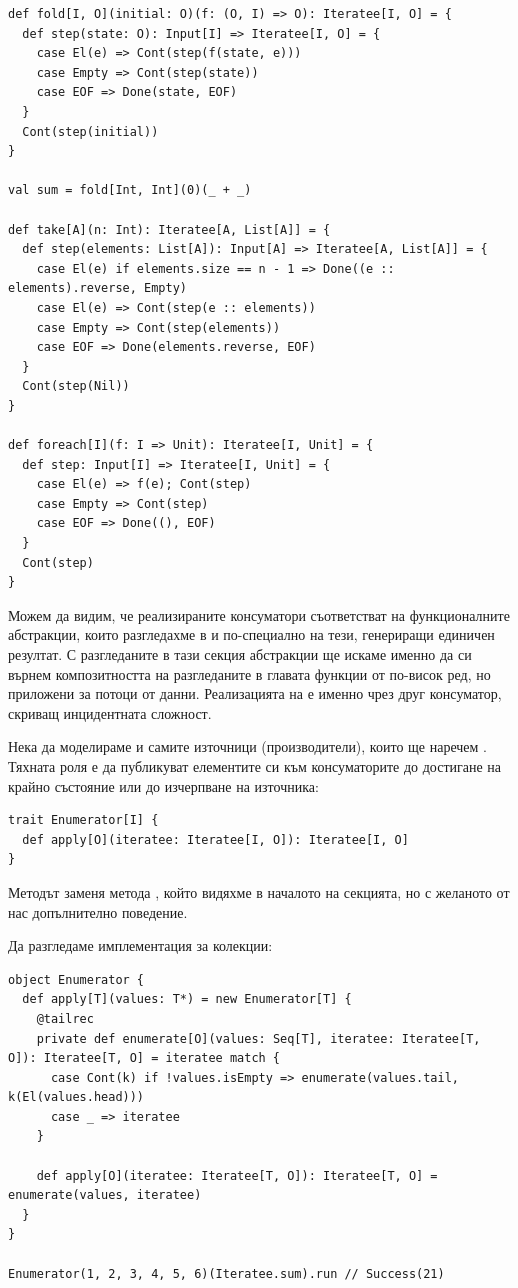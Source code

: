\begin{lstlisting}
def fold[I, O](initial: O)(f: (O, I) => O): Iteratee[I, O] = {
  def step(state: O): Input[I] => Iteratee[I, O] = {
    case El(e) => Cont(step(f(state, e)))
    case Empty => Cont(step(state))
    case EOF => Done(state, EOF)
  }
  Cont(step(initial))
}

val sum = fold[Int, Int](0)(_ + _)

def take[A](n: Int): Iteratee[A, List[A]] = {
  def step(elements: List[A]): Input[A] => Iteratee[A, List[A]] = {
    case El(e) if elements.size == n - 1 => Done((e :: elements).reverse, Empty)
    case El(e) => Cont(step(e :: elements))
    case Empty => Cont(step(elements))
    case EOF => Done(elements.reverse, EOF)
  }
  Cont(step(Nil))
}

def foreach[I](f: I => Unit): Iteratee[I, Unit] = {
  def step: Input[I] => Iteratee[I, Unit] = {
    case El(e) => f(e); Cont(step)
    case Empty => Cont(step)
    case EOF => Done((), EOF)
  }
  Cont(step)
}
\end{lstlisting}

Можем да видим, че реализираните консуматори съответстват на функционалните абстракции, които разгледахме в  и по-специално на тези, генериращи единичен резултат. С разгледаните в тази секция абстракции ще искаме именно да си върнем композитността на разгледаните в главата функции от по-висок ред, но приложени за потоци от данни. Реализацията на  е именно чрез друг консуматор, скриващ инцидентната сложност.

Нека да моделираме и самите източници (производители), които ще наречем . Тяхната роля е да публикуват елементите си към консуматорите до достигане на крайно състояние или до изчерпване на източника:

\begin{lstlisting}
trait Enumerator[I] {
  def apply[O](iteratee: Iteratee[I, O]): Iteratee[I, O]
}
\end{lstlisting}

Методът  заменя метода , който видяхме в началото на секцията, но с желаното от нас допълнително поведение.

Да разгледаме имплементация за колекции:

\begin{lstlisting}
object Enumerator {
  def apply[T](values: T*) = new Enumerator[T] {
    @tailrec
    private def enumerate[O](values: Seq[T], iteratee: Iteratee[T, O]): Iteratee[T, O] = iteratee match {
      case Cont(k) if !values.isEmpty => enumerate(values.tail, k(El(values.head)))
      case _ => iteratee
    }
  
    def apply[O](iteratee: Iteratee[T, O]): Iteratee[T, O] = enumerate(values, iteratee)
  }
}

Enumerator(1, 2, 3, 4, 5, 6)(Iteratee.sum).run // Success(21)
\end{lstlisting}

